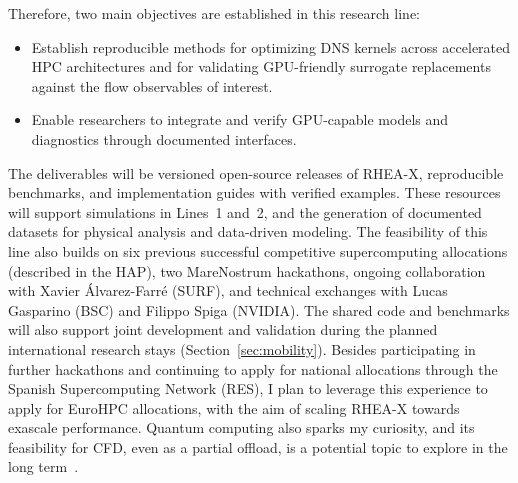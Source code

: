\documentclass[11pt]{article}
\begin{document}
Therefore, two main objectives are established in this research line:
\begin{itemize}
	\item[\textbf{O7.}] Establish reproducible methods for optimizing DNS kernels across accelerated HPC architectures and for validating GPU-friendly surrogate replacements against the flow observables of interest.
	\item[\textbf{O8.}] Enable researchers to integrate and verify GPU-capable models and diagnostics through documented interfaces.
\end{itemize}

The deliverables will be versioned open-source releases of RHEA-X, reproducible benchmarks, and implementation guides with verified examples. 
These resources will support simulations in Lines~1 and~2, and the generation of documented datasets for physical analysis and data-driven modeling. 
The feasibility of this line also builds on six previous successful competitive supercomputing allocations (described in the HAP), two MareNostrum hackathons, ongoing collaboration with Xavier Álvarez-Farré (SURF), and technical exchanges with Lucas Gasparino (BSC) and Filippo Spiga (NVIDIA). 
The shared code and benchmarks will also support joint development and validation during the planned international research stays (Section~\ref{sec:mobility}).
Besides participating in further hackathons and continuing to apply for national allocations through the Spanish Supercomputing Network (RES), I plan to leverage this experience to apply for EuroHPC allocations, with the aim of scaling RHEA-X towards exascale performance.
Quantum computing also sparks my curiosity, and its feasibility for CFD, even as a partial offload, is a potential topic to explore in the long term~\cite{Bharadwaj2023}.

\end{document}
